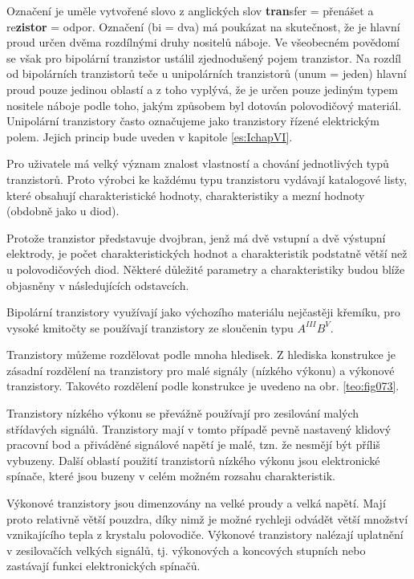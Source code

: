     Označení  je uměle vytvořené slovo z anglických slov \textbf{tran}sfer = přenášet
    a re\textbf{zistor} = odpor. Označení  (bi = dva) má poukázat na skutečnost, že je
    hlavní proud určen dvěma rozdílnými druhy nositelů náboje. Ve všeobecném povědomí se však pro
    bipolární tranzistor ustálil zjednodušený pojem tranzistor. Na rozdíl od bipolárních tranzistorů
    teče u unipolárních tranzistorů (unum = jeden) hlavní proud pouze jedinou oblastí a z toho
    vyplývá, že je určen pouze jediným typem nositele náboje podle toho, jakým způsobem byl dotován
    polovodičový materiál. Unipolární tranzistory často označujeme jako tranzistory řízené
    elektrickým polem. Jejich princip bude uveden v kapitole \ref{es:IchapVI}.
    
    Pro uživatele má velký význam znalost vlastností a chování jednotlivých typů tranzistorů. Proto
    výrobci ke každému typu tranzistoru vydávají katalogové listy, které obsahují charakteristické
    hodnoty, charakteristiky a mezní hodnoty (obdobně jako u diod).
    
    Protože tranzistor představuje dvojbran, jenž má dvě vstupní a dvě výstupní elektrody, je počet
    charakteristických hodnot a charakteristik podstatně větší než u polovodičových diod. Některé
    důležité parametry a charakteristiky budou blíže objasněny v následujících odstavcích.
    
    Bipolární tranzistory využívají jako výchozího materiálu nejčastěji křemíku, pro vysoké kmitočty
    se používají tranzistory ze sloučenin typu \(A^{III}B^{V}\).
    
    Tranzistory můžeme rozdělovat podle mnoha hledisek. Z hlediska konstrukce je zásadní rozdělení
    na tranzistory pro malé signály (nízkého výkonu) a výkonové tranzistory. Takovéto rozdělení
    podle konstrukce je uvedeno na obr. \ref{teo:fig073}.
    
    Tranzistory nízkého výkonu se převážně používají pro zesilování malých střídavých signálů.
    Tranzistory mají v tomto případě pevně nastavený klidový pracovní bod a přiváděné signálové
    napětí je malé, tzn. že nesmějí být příliš vybuzeny. Další oblastí použití tranzistorů nízkého
    výkonu jsou elektronické spínače, které jsou buzeny v celém možném rozsahu charakteristik.
    
    Výkonové tranzistory jsou dimenzovány na velké proudy a velká napětí. Mají proto relativně větší
    pouzdra, díky nimž je možné rychleji odvádět větší množství vznikajícího tepla z krystalu
    polovodiče. Výkonové tranzistory nalézají uplatnění v zesilovačích velkých signálů, tj.
    výkonových a koncových stupních nebo zastávají funkci elektronických spínačů.

